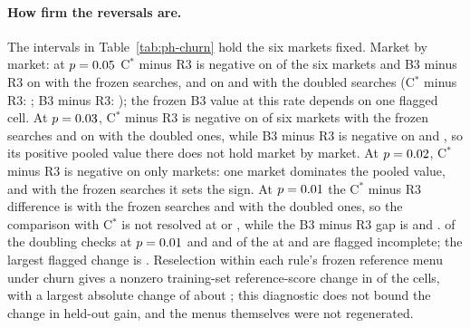 \documentclass[11pt]{article}
\begin{document}
\paragraph{How firm the reversals are.} The intervals in Table~\ref{tab:ph-churn} hold the six markets fixed. Market by market: at $p = 0.05$ C$^*$ minus R3 is negative on  of the six markets and B3 minus R3 on  with the frozen searches, and on  and  with the doubled searches (C$^*$ minus R3: ; B3 minus R3: ); the frozen B3 value at this rate depends on one flagged cell. At $p = 0.03$, C$^*$ minus R3 is negative on  of six markets with the frozen searches and on  with the doubled ones, while B3 minus R3 is negative on  and , so its positive pooled value there does not hold market by market. At $p = 0.02$, C$^*$ minus R3 is negative on only  markets: one market dominates the pooled value, and with the frozen searches it sets the sign. At $p = 0.01$ the C$^*$ minus R3 difference is  with the frozen searches and  with the doubled ones, so the comparison with C$^*$ is not resolved at  or , while the B3 minus R3 gap is  and .  of the  doubling checks at $p = 0.01$ and  and  of the  at  and  are flagged incomplete; the largest flagged change is . Reselection within each rule's frozen reference menu under churn gives a nonzero training-set reference-score change in  of the  cells, with a largest absolute change of about ; this diagnostic does not bound the change in held-out gain, and the menus themselves were not regenerated.
\end{document}
